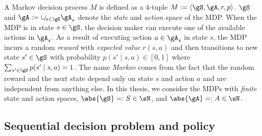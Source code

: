 A Markov decision process $M$ is defined as a $4$-tuple $M:=\langle\gS, \gA, r, p\rangle$.
$\gS$ and $\gA:=\cup_{s\in\gS}\gA_s$ denote the \emph{state} and \emph{action} space of the MDP.
When the MDP is in state $s\in\gS$, the decision maker can execute one of the available actions in $\gA_s$.
As a result of executing action $a\in\gA_s$ in state $s$, the MDP incurs a random \emph{reward} with \emph{expected value} $r(s,a)$ and then transitions to new state $s'\in\gS$ with probability $p(s'\mid s, a)\in[0,1]$ where $\sum_{s'\in\gS}p(s'\mid s,a)=1$.
The name \emph{Markov} comes from the fact that the random reward and the next state depend only on state $s$ and action $a$ and are independent from anything else.
In this thesis, we consider the MDPs with \emph{finite} state and action spaces, $\abs{\gS}=:S\in\sN$, and $\abs{\gA}=:A\in\sN$.


\subsection{Sequential decision problem and policy}

